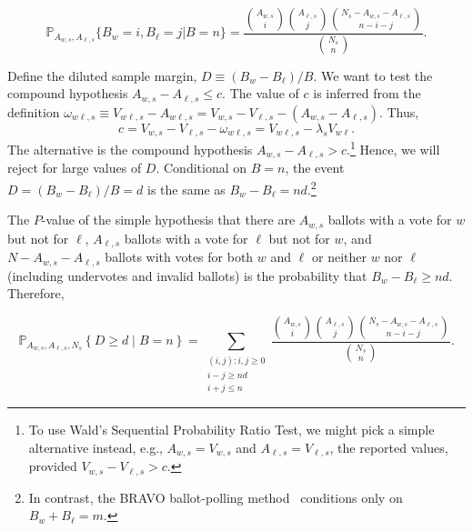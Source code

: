 \begin{equation}
    \mathbb{P}_{A_{w,s}, A_{\ell,s}} \{ B_w = i, B_\ell = j \vert B=n \} = 
     \frac{ {A_{w,s } \choose i}{A_{\ell,s} \choose j}{N_s - A_{w,s} - A_{\ell,s} \choose n-i-j}}{{N_s \choose n}}.
\end{equation}

Define the diluted sample margin, $D \equiv (B_w - B_\ell)/B$.
We want to test the compound hypothesis $A_{w,s} - A_{\ell,s} \le c$.
The value of $c$ is inferred from the definition
$\omega_{w\ell,s} \equiv V_{w\ell,s} - A_{w\ell,s} = V_{w,s} - V_{\ell,s} - (A_{w,s} -A_{\ell,s})$.
Thus,
$$
    c = V_{w,s} - V_{\ell,s} - \omega_{w\ell,s} = V_{w\ell,s} - \lambda_s V_{w\ell}.
$$
The alternative is the compound hypothesis 
$A_{w,s} - A_{\ell,s} > c$.\footnote{%
    To use Wald's Sequential Probability Ratio Test, we might pick a simple alternative instead, e.g.,
   $A_{w,s} = V_{w,s}$ and $A_{\ell,s} = V_{\ell,s}$, the reported values, provided 
   $V_{w,s} - V_{\ell,s} > c$.
}
Hence, we will reject for large values of $D$.
Conditional on $B=n$, the event $D = (B_w - B_\ell)/B = d$ is the same as $B_w - B_\ell = nd$.\footnote{%
In contrast, the BRAVO ballot-polling
method~\cite{lindemanEtal12}
conditions only on $B_w+B_\ell = m$.
}


The $P$-value of the simple hypothesis that there are $A_{w,s}$ ballots with
a vote for $w$ but not for $\ell$, $A_{\ell,s}$ ballots with a vote for $\ell$ but not for $w$, 
and $N - A_{w,s} - A_{\ell,s}$ ballots with votes for both $w$ and $\ell$ or neither $w$ nor $\ell$ 
(including undervotes and
invalid ballots) is the probability that $B_w - B_\ell \geq nd$.
Therefore,

\begin{equation}
   \mathbb{P}_{A_{w,s}, A_{\ell,s}, N_s} \left \{ D \geq d \;\vert\; B = n\right \} = 
   \sum_{\substack{(i, j) :  i, j\ge 0 \\ i-j \geq nd \\ i+j \leq n}} \frac{ {A_{w,s } \choose i}{A_{\ell,s} \choose j}{N_s - A_{w,s} - A_{\ell,s} \choose n-i-j}}{{N_s \choose n}}.
\end{equation}


